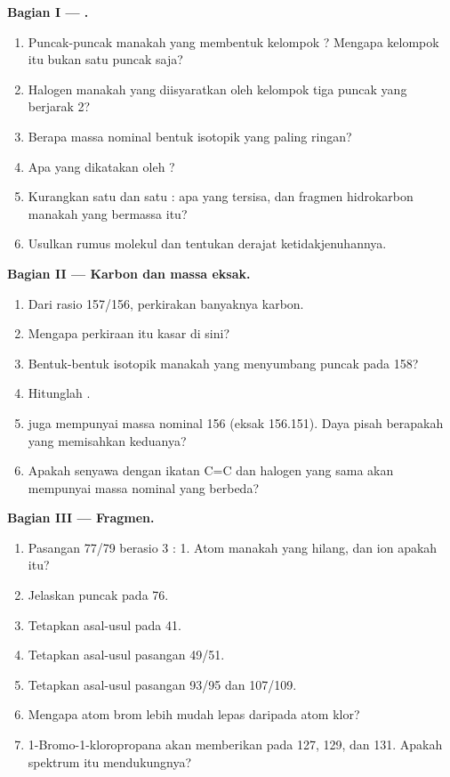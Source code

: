 \begin{problem}
\medskip
\noindent\textbf{Bagian I --- .}
\begin{enumerate}
  \item Puncak-puncak manakah yang membentuk kelompok ? Mengapa
        kelompok itu bukan satu puncak saja?
  \item Halogen manakah yang diisyaratkan oleh kelompok tiga puncak yang berjarak 2?
  \item Berapa massa nominal bentuk isotopik yang paling ringan?
  \item Apa yang dikatakan oleh ?
  \item Kurangkan satu  dan satu : apa yang tersisa,
        dan fragmen hidrokarbon manakah yang bermassa itu?
  \item Usulkan rumus molekul dan tentukan derajat ketidakjenuhannya.
\end{enumerate}

\medskip
\noindent\textbf{Bagian II --- Karbon dan massa eksak.}
\begin{enumerate}[resume]
  \item Dari rasio 157/156, perkirakan banyaknya karbon.
  \item Mengapa perkiraan itu kasar di sini?
  \item Bentuk-bentuk isotopik manakah yang menyumbang puncak pada 158?
  \item Hitunglah  .
  \item {} juga mempunyai massa nominal 156 (eksak 156.151). Daya
        pisah berapakah yang memisahkan keduanya?
  \item Apakah  senyawa dengan ikatan C=C dan halogen yang sama
        akan mempunyai massa nominal yang berbeda?
\end{enumerate}

\medskip
\noindent\textbf{Bagian III --- Fragmen.}
\begin{enumerate}[resume]
  \item Pasangan 77/79 berasio 3 : 1. Atom manakah yang hilang, dan ion apakah itu?
  \item Jelaskan puncak pada 76.
  \item Tetapkan asal-usul  pada 41.
  \item Tetapkan asal-usul pasangan 49/51.
  \item Tetapkan asal-usul pasangan 93/95 dan 107/109.
  \item Mengapa atom brom lebih mudah lepas daripada atom klor?
  \item 1-Bromo-1-kloropropana akan memberikan  pada 127, 129,
        dan 131. Apakah spektrum itu mendukungnya?
\end{enumerate}


\end{problem}
